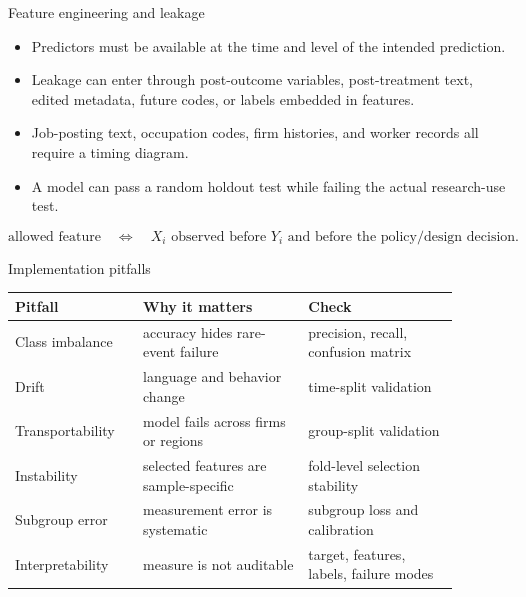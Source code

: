 \documentclass[aspectratio=169,11pt]{beamer}
\newcommand{\1}{\mathbf{1}}
\begin{document}
\begin{frame}{Feature engineering and leakage}
\small
\begin{itemize}
    \item Predictors must be available at the time and level of the intended prediction.
    \item Leakage can enter through post-outcome variables, post-treatment text, edited metadata, future codes, or labels embedded in features.
    \item Job-posting text, occupation codes, firm histories, and worker records all require a timing diagram.
    \item A model can pass a random holdout test while failing the actual research-use test.
\end{itemize}

\medskip
\[
\text{allowed feature}
\quad \Longleftrightarrow \quad
X_i \text{ observed before } Y_i \text{ and before the policy/design decision.}
\]
\end{frame}

\begin{frame}{Implementation pitfalls}
\small
\begin{tabular}{p{0.25\linewidth} p{0.33\linewidth} p{0.30\linewidth}}
\toprule
Pitfall & Why it matters & Check \\
\midrule
Class imbalance & accuracy hides rare-event failure & precision, recall, confusion matrix \\
Drift & language and behavior change & time-split validation \\
Transportability & model fails across firms or regions & group-split validation \\
Instability & selected features are sample-specific & fold-level selection stability \\
Subgroup error & measurement error is systematic & subgroup loss and calibration \\
Interpretability & measure is not auditable & target, features, labels, failure modes \\
\bottomrule
\end{tabular}
\end{frame}
\end{document}
